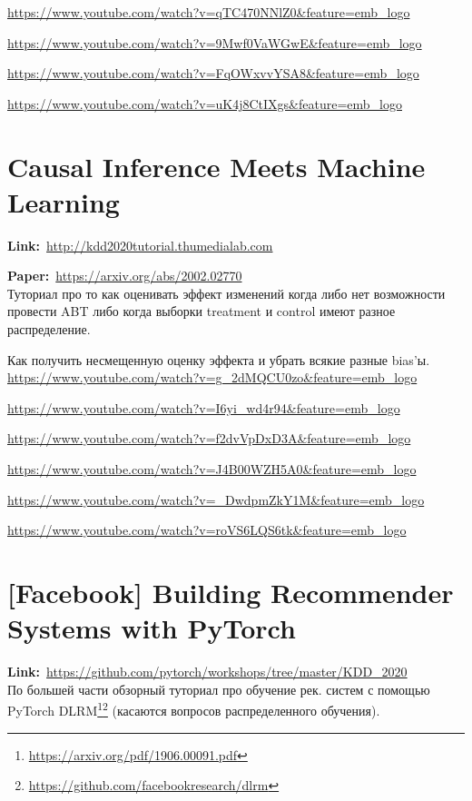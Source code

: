 \url{https://www.youtube.com/watch?v=qTC470NNlZ0&feature=emb_logo}

\url{https://www.youtube.com/watch?v=9Mwf0VaWGwE&feature=emb_logo}

\url{https://www.youtube.com/watch?v=FqOWxvvYSA8&feature=emb_logo}

\url{https://www.youtube.com/watch?v=uK4j8CtIXgs&feature=emb_logo}


\section{Causal Inference Meets Machine Learning} 

\textbf{Link:}~\url{http://kdd2020tutorial.thumedialab.com}

\textbf{Paper:}~\url{https://arxiv.org/abs/2002.02770} \\

Туториал про то как оценивать эффект изменений когда либо нет возможности провести ABT либо когда выборки treatment и control имеют разное распределение.

Как получить несмещенную оценку эффекта и убрать всякие разные bias'ы. \\

\url{https://www.youtube.com/watch?v=g_2dMQCU0zo&feature=emb_logo}

\url{https://www.youtube.com/watch?v=I6yi_wd4r94&feature=emb_logo}

\url{https://www.youtube.com/watch?v=f2dvVpDxD3A&feature=emb_logo}

\url{https://www.youtube.com/watch?v=J4B00WZH5A0&feature=emb_logo}

\url{https://www.youtube.com/watch?v=_DwdpmZkY1M&feature=emb_logo}

\url{https://www.youtube.com/watch?v=roVS6LQS6tk&feature=emb_logo}


\newpage
\section{[Facebook] Building Recommender Systems with PyTorch} 

\textbf{Link:}~\url{https://github.com/pytorch/workshops/tree/master/KDD_2020} \\

По большей части обзорный туториал про обучение рек. систем с помощью PyTorch DLRM\footnote{\url{https://arxiv.org/pdf/1906.00091.pdf}}\footnote{\url{https://github.com/facebookresearch/dlrm}} (касаются вопросов распределенного обучения). \\

